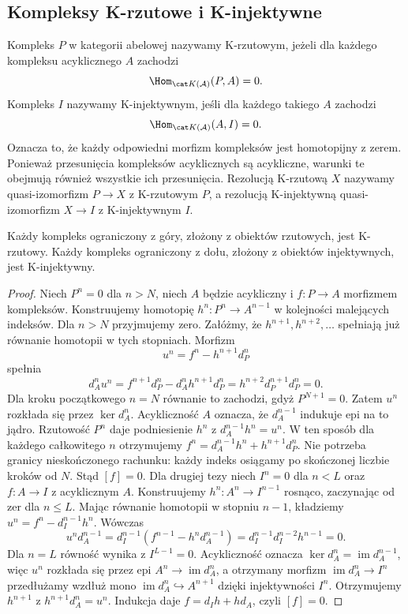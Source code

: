 \subsection{Kompleksy K-rzutowe i K-injektywne}
\begin{definicja}\label{cat:def:k-projective-injective}
Kompleks $P$ w kategorii abelowej nazywamy K-rzutowym, jeżeli dla każdego kompleksu acyklicznego $A$ zachodzi
\[
 \Hom_{\cat K(\mathcal A)}(P,A)=0.
\]
Kompleks $I$ nazywamy K-injektywnym, jeśli dla każdego takiego $A$ zachodzi
\[
 \Hom_{\cat K(\mathcal A)}(A,I)=0.
\] Oznacza to, że każdy odpowiedni morfizm kompleksów jest homotopijny z zerem. Ponieważ przesunięcia kompleksów acyklicznych są acykliczne, warunki te obejmują również wszystkie ich przesunięcia. Rezolucją K-rzutową $X$ nazywamy quasi-izomorfizm $P\to X$ z K-rzutowym $P$, a rezolucją K-injektywną quasi-izomorfizm $X\to I$ z K-injektywnym $I$.
\end{definicja}
\begin{twierdzenie}\label{cat:thm:bounded-k-projective}
Każdy kompleks ograniczony z góry, złożony z obiektów rzutowych, jest K-rzutowy. Każdy kompleks ograniczony z dołu, złożony z obiektów injektywnych, jest K-injektywny.
\end{twierdzenie}
\begin{proof}
Niech $P^n=0$ dla $n>N$, niech $A$ będzie acykliczny i $f:P\to A$ morfizmem kompleksów. Konstruujemy homotopię $h^n:P^n\to A^{n-1}$ w kolejności malejących indeksów. Dla $n>N$ przyjmujemy zero. Załóżmy, że $h^{n+1},h^{n+2},\ldots$ spełniają już równanie homotopii w tych stopniach. Morfizm
\[
 u^n=f^n-h^{n+1}d_P^n
\]
spełnia
\[
 d_A^nu^n=f^{n+1}d_P^n-d_A^nh^{n+1}d_P^n
 =h^{n+2}d_P^{n+1}d_P^n=0.
\]
Dla kroku początkowego $n=N$ równanie to zachodzi, gdyż $P^{N+1}=0$. Zatem $u^n$ rozkłada się przez $\ker d_A^n$. Acykliczność $A$ oznacza, że $d_A^{n-1}$ indukuje epi na to jądro. Rzutowość $P^n$ daje podniesienie $h^n$ z $d_A^{n-1}h^n=u^n$. W ten sposób dla każdego całkowitego $n$ otrzymujemy $f^n=d_A^{n-1}h^n+h^{n+1}d_P^n$. Nie potrzeba granicy nieskończonego rachunku: każdy indeks osiągamy po skończonej liczbie kroków od $N$. Stąd $[f]=0$. Dla drugiej tezy niech $I^n=0$ dla $n<L$ oraz $f:A\to I$ z acyklicznym $A$. Konstruujemy $h^n:A^n\to I^{n-1}$ rosnąco, zaczynając od zer dla $n\le L$. Mając równanie homotopii w stopniu $n-1$, kładziemy $u^n=f^n-d_I^{n-1}h^n$. Wówczas
\[
 u^nd_A^{n-1}=d_I^{n-1}(f^{n-1}-h^nd_A^{n-1})
 =d_I^{n-1}d_I^{n-2}h^{n-1}=0.
\]
Dla $n=L$ równość wynika z $I^{L-1}=0$. Acykliczność oznacza $\ker d_A^n=\operatorname{im}d_A^{n-1}$, więc $u^n$ rozkłada się przez epi $A^n\to\operatorname{im}d_A^n$, a otrzymany morfizm $\operatorname{im}d_A^n\to I^n$ przedłużamy wzdłuż mono $\operatorname{im}d_A^n\hookrightarrow A^{n+1}$ dzięki injektywności $I^n$. Otrzymujemy $h^{n+1}$ z $h^{n+1}d_A^n=u^n$. Indukcja daje $f=d_Ih+hd_A$, czyli $[f]=0$.
\end{proof}
